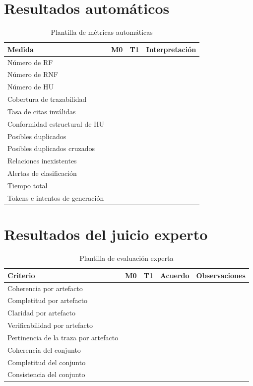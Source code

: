 \section{Resultados automáticos}


\begin{table}[H]
  \centering
  \caption{Plantilla de métricas automáticas}
  \label{tab:metricas-automaticas}
  \small
  \begin{tabularx}{\textwidth}{Yp{2.5cm}p{2.5cm}Y}
    \toprule
    Medida & M0 & T1 & Interpretación \\
    \midrule
    Número de RF & & & \\
    Número de RNF & & & \\
    Número de HU & & & \\
    Cobertura de trazabilidad & & & \\
    Tasa de citas inválidas & & & \\
    Conformidad estructural de HU & & & \\
    Posibles duplicados & & & \\
    Posibles duplicados cruzados & & & \\
    Relaciones inexistentes & & & \\
    Alertas de clasificación & & & \\
    Tiempo total & & & \\
    Tokens e intentos de generación & & & \\
    \bottomrule
  \end{tabularx}
\end{table}

\section{Resultados del juicio experto}

\begin{table}[H]
  \centering
  \caption{Plantilla de evaluación experta}
  \label{tab:juicio-experto}
  \small
  \begin{tabularx}{\textwidth}{p{3.0cm}p{2.0cm}p{2.0cm}p{2.4cm}Y}
    \toprule
    Criterio & M0 & T1 & Acuerdo & Observaciones \\
    \midrule
    Coherencia por artefacto & & & & \\
    Completitud por artefacto & & & & \\
    Claridad por artefacto & & & & \\
    Verificabilidad por artefacto & & & & \\
    Pertinencia de la traza por artefacto & & & & \\
    Coherencia del conjunto & & & & \\
    Completitud del conjunto & & & & \\
    Consistencia del conjunto & & & & \\
    \bottomrule
  \end{tabularx}
\end{table}

